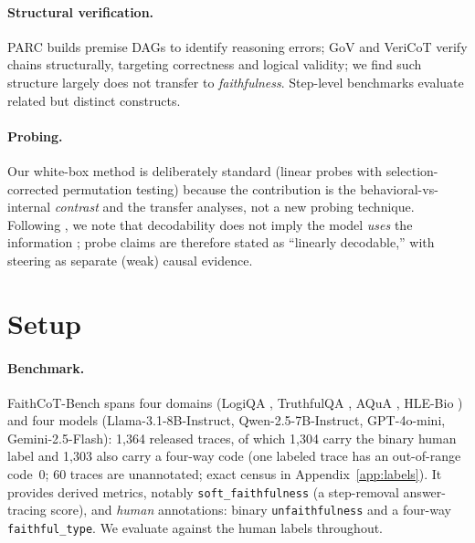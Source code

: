 \documentclass{article}
\begin{document}
\paragraph{Structural verification.} PARC \citep{mukherjee2025parc} builds premise DAGs to identify reasoning errors; GoV \citep{fang2025gov} and VeriCoT \citep{feng2025vericot} verify chains structurally, targeting correctness and logical validity; we find such structure largely does not transfer to \emph{faithfulness}. Step-level benchmarks \citep{zheng2024processbench,jacovi2024reveal,pham2026grace} evaluate related but distinct constructs.

\paragraph{Probing.} Our white-box method is deliberately standard (linear probes with selection-corrected permutation testing) because the contribution is the behavioral-vs-internal \emph{contrast} and the transfer analyses, not a new probing technique. Following \citet{belinkov2022probing}, we note that decodability does not imply the model \emph{uses} the information \citep{elazar2021amnesic}; probe claims are therefore stated as ``linearly decodable,'' with steering as separate (weak) causal evidence.

\section{Setup}
\label{sec:setup}

\paragraph{Benchmark.} FaithCoT-Bench spans four domains (LogiQA \citep{liu2020logiqa}, TruthfulQA \citep{lin2022truthfulqa}, AQuA \citep{ling2017aqua}, HLE-Bio \citep{phan2025hle}) and four models (Llama-3.1-8B-Instruct, Qwen-2.5-7B-Instruct, GPT-4o-mini, Gemini-2.5-Flash): 1{,}364 released traces, of which 1{,}304 carry the binary human label and 1{,}303 also carry a four-way code (one labeled trace has an out-of-range code~0; 60 traces are unannotated; exact census in Appendix~\ref{app:labels}). It provides derived metrics, notably \texttt{soft\_faithfulness} (a step-removal answer-tracing score), and \emph{human} annotations: binary \texttt{unfaithfulness} and a four-way \texttt{faithful\_type}. We evaluate against the human labels throughout.
\end{document}

